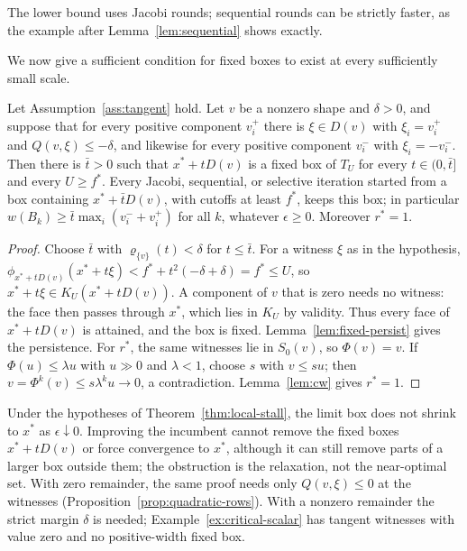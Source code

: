 The lower bound uses Jacobi rounds; sequential rounds can be strictly
faster, as the example after Lemma~\ref{lem:sequential} shows exactly.

We now give a sufficient condition for fixed boxes to exist at every
sufficiently small scale.

\begin{theorem}[Stalling]\label{thm:local-stall}
Let Assumption~\ref{ass:tangent} hold. Let $v$ be a nonzero shape and
$\delta>0$, and suppose that for every positive component $v_i^+$ there is
$\xi\in D(v)$ with $\xi_i=v_i^+$ and $Q(v,\xi)\le-\delta$, and likewise for
every positive component $v_i^-$ with $\xi_i=-v_i^-$. Then there is
$\bar t>0$ such that $x^*+tD(v)$ is a fixed box of $T_U$ for every
$t\in(0,\bar t]$ and every $U\ge f^*$. Every Jacobi, sequential, or selective
iteration started from a box containing $x^*+\bar tD(v)$, with cutoffs at
least $f^*$, keeps this box; in particular
$w(B_k)\ge\bar t\max_i(v_i^-+v_i^+)$ for all $k$, whatever $\epsilon\ge0$.
Moreover $r^*=1$.
\end{theorem}

\begin{proof}
Choose $\bar t$ with $\varrho_{\{v\}}(t)<\delta$ for $t\le\bar t$. For a
witness $\xi$ as in the hypothesis,
$\phi_{x^*+tD(v)}(x^*+t\xi)<f^*+t^2(-\delta+\delta)=f^*\le U$, so
$x^*+t\xi\in K_U(x^*+tD(v))$. A component of $v$ that is zero needs no
witness: the face then passes through $x^*$, which lies in $K_U$ by
validity. Thus every face of $x^*+tD(v)$ is attained, and the box is fixed.
Lemma~\ref{lem:fixed-persist} gives the persistence. For $r^*$, the same
witnesses lie in $S_0(v)$, so $\Phi(v)=v$. If $\Phi(u)\le\lambda u$ with
$u\gg0$ and $\lambda<1$, choose $s$ with $v\le su$; then
$v=\Phi^k(v)\le s\lambda^ku\to0$, a contradiction. Lemma~\ref{lem:cw} gives
$r^*=1$.
\end{proof}

Under the hypotheses of Theorem~\ref{thm:local-stall}, the limit box does
not shrink to $x^*$ as $\epsilon\downarrow0$. Improving the incumbent cannot
remove the fixed boxes $x^*+tD(v)$ or force convergence to $x^*$, although
it can still remove parts of a larger box outside them; the obstruction is
the relaxation, not the near-optimal set. With zero remainder, the same
proof needs only $Q(v,\xi)\le0$ at the witnesses
(Proposition~\ref{prop:quadratic-rows}). With a nonzero remainder the strict
margin $\delta$ is needed; Example~\ref{ex:critical-scalar} has tangent
witnesses with value zero and no positive-width fixed box.


